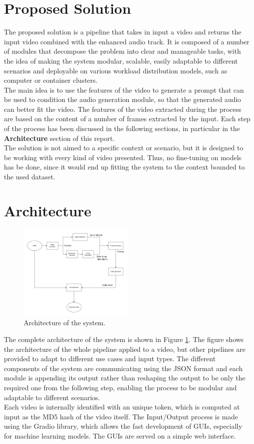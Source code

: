 \documentclass[conference]{IEEEtran}
\begin{document}
\section{Proposed Solution}
The proposed solution is a pipeline that takes in input a video and returns the input video combined with the enhanced audio track. It is composed of a number of modules that decompose the problem into clear and manageable tasks, with the idea of making the system modular, scalable, easily adaptable to different scenarios and deployable on various workload distribution models, such as computer or container clusters. \\
The main idea is to use the features of the video to generate a prompt that can be used to condition the audio generation module, so that the generated audio can better fit the video. The features of the video extracted during the process are based on the content of a number of frames extracted by the input. Each step of the process has been discussed in the following sections, in particular in the \textbf{Architecture} section of this report.\\
The solution is not aimed to a specific context or scenario, but it is designed to be working with every kind of video presented. Thus, no fine-tuning on models has be done, since it would end up fitting the system to the context bounded to the used dataset.

\section{Architecture}

\begin{figure}[h]
    \centerline{\includegraphics[width=0.5\textwidth]{final_architecture.png}}
    \caption{Architecture of the system.}
    \label{architecture}
\end{figure}
The complete architecture of the system is shown in Figure \ref{architecture}.
The figure shows the architecture of the whole pipeline applied to a video,
but other pipelines are provided to adapt to different use cases and input types.
The different components of the system are communicating using the JSON format and each module is appending its output rather than reshaping the output to be only the required one from the following step, enabling the process to be modular and adaptable to different scenarios.\\
Each video is internally identified with an unique token, which is computed at input as the MD5 hash of the video itself. 
The Input/Output process is made using the Gradio \cite{Gradio} library, which allows the fast development of GUIs, especially for machine learning models. The GUIs are served on a simple web interface.
 
\end{document}
